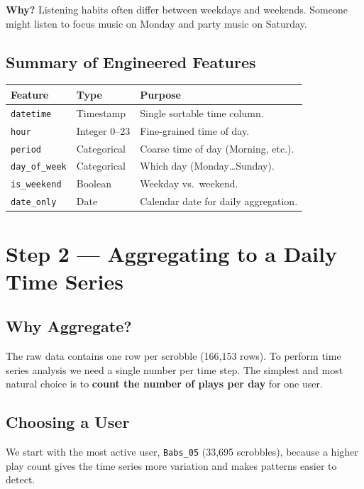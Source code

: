 \documentclass[12pt, a4paper]{article}
\begin{document}
\textbf{Why?} Listening habits often differ between weekdays and weekends.
Someone might listen to focus music on Monday and party music on Saturday.

\subsection{Summary of Engineered Features}

\begin{center}
\begin{tabular}{llp{7cm}}
    \toprule
    \textbf{Feature} & \textbf{Type} & \textbf{Purpose} \\
    \midrule
    \texttt{datetime}     & Timestamp    & Single sortable time column. \\
    \texttt{hour}         & Integer 0--23 & Fine-grained time of day. \\
    \texttt{period}       & Categorical  & Coarse time of day (Morning, etc.). \\
    \texttt{day\_of\_week}& Categorical  & Which day (Monday\ldots Sunday). \\
    \texttt{is\_weekend}  & Boolean      & Weekday vs.\ weekend. \\
    \texttt{date\_only}   & Date         & Calendar date for daily aggregation. \\
    \bottomrule
\end{tabular}
\end{center}

\section{Step 2 --- Aggregating to a Daily Time Series}

\subsection{Why Aggregate?}
The raw data contains one row per scrobble (166{,}153 rows). To perform time
series analysis we need a single number per time step. The simplest and most
natural choice is to \textbf{count the number of plays per day} for one user.

\subsection{Choosing a User}
We start with the most active user, \texttt{Babs\_05} (33{,}695 scrobbles),
because a higher play count gives the time series more variation and makes
patterns easier to detect.
\end{document}
